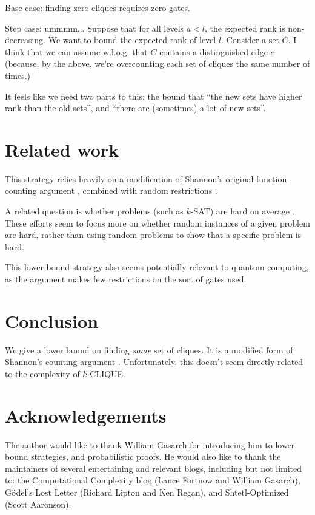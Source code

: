 \documentclass[12pt]{article}
\theoremstyle{definition}
\begin{document}
Base case: finding zero cliques requires zero gates.

Step case: ummmm... Suppose that for all levels $a < l$,
the expected rank is non-decreasing.
We want to bound the expected rank of level $l$.
Consider a set $C$. I think that we can assume w.l.o.g. that
$C$ contains a distinguished edge $e$ (because, by the above,
we're overcounting each set of cliques the same number of times.)


It feels like we need two parts to this: the bound that
``the new sets have higher rank than the old sets'', and
``there are (sometimes) a lot of new sets''.


\section{Related work}

This strategy relies heavily on a modification of Shannon's original
function-counting argument \cite{shannon_synthesis_1949},
combined with random restrictions
\cite{subbotovskaya1963comparison} \cite{hastad1987lower}.

A related question is whether problems
(such as $k$-SAT) are
hard on average \cite{bogdanov2006average}.
These efforts seem to focus more on whether
random
instances of a given problem are hard, rather
than using random problems to show that
a specific problem is hard.

This lower-bound strategy also seems potentially
relevant to quantum computing,
as the argument makes few restrictions on the sort of gates used.

\section{Conclusion}

We give a lower bound on finding {\em some} set of cliques.
It is a modified form of Shannon's counting argument
\cite{shannon_synthesis_1949}. Unfortunately,
this doesn't seem directly related to the
complexity of $k$-CLIQUE.

\section{Acknowledgements}

The author would like to thank William Gasarch for introducing him
to lower bound strategies, and probabilistic proofs.
He would also like to thank the maintainers of
several entertaining and relevant blogs, including but
not limited to: the Computational Complexity blog
(Lance Fortnow and William Gasarch), 
G\"odel's Lost Letter (Richard Lipton and Ken Regan),
and Shtetl-Optimized (Scott Aaronson). 
\end{document}
